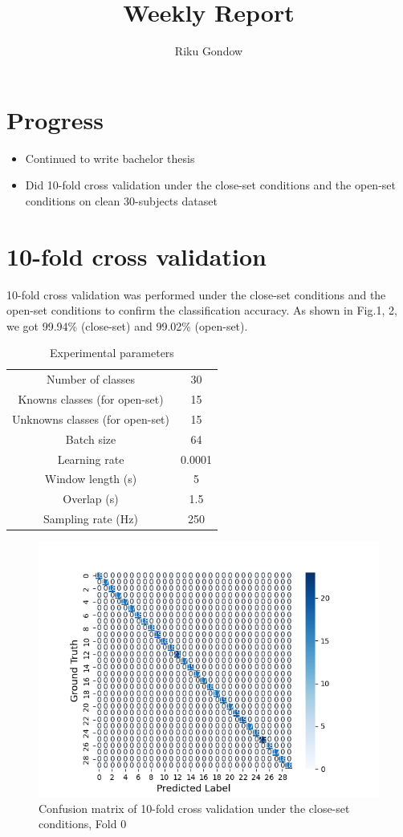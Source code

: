 \documentclass[dvipdfmx]{article}
\begin{document}
\title{Weekly Report}
\author{Riku Gondow}
\maketitle
\section{Progress}
\begin{itemize}
    \item Continued to write bachelor thesis
    \item Did 10-fold cross validation under the close-set conditions and the open-set conditions on clean 30-subjects dataset
\end{itemize}

\section{10-fold cross validation}
10-fold cross validation was performed under the close-set conditions and the open-set conditions to confirm the classification accuracy. As shown in Fig.1, 2, we got 99.94\% (close-set) and 99.02\% (open-set).

\begin{table}[H]
\caption{Experimental parameters}
\centering
\begin{tabular}{cc}
\hline
Number of classes & 30 \\
Knowns classes (for open-set) & 15 \\
Unknowns classes (for open-set) & 15 \\
Batch size & 64 \\
Learning rate & 0.0001 \\
Window length (s) & 5 \\
Overlap (s) & 1.5 \\
Sampling rate (Hz) & 250 \\
\hline
\end{tabular}
\end{table}

\begin{figure}[H]
\begin{center}
\includegraphics[width=0.8\linewidth]{./img/cross_val_Fold0_close.png}
\end{center}
\caption{Confusion matrix of 10-fold cross validation under the close-set conditions, Fold 0}
\end{figure}
\end{document}
